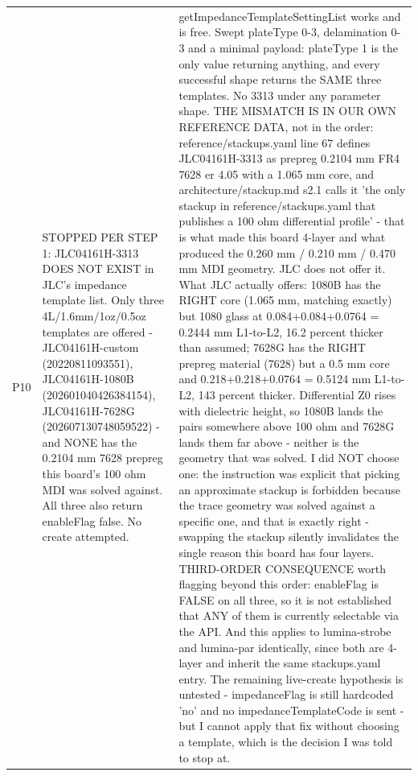 \documentclass[11pt,a4paper]{article}
\begin{document}
{\begin{longtable}{lp{5.2cm}p{7.2cm}}
P10 & STOPPED PER STEP 1: JLC04161H-3313 DOES NOT EXIST in JLC's impedance template list. Only three 4L/1.6mm/1oz/0.5oz templates are offered - JLC04161H-custom (20220811093551), JLC04161H-1080B (202601040426384154), JLC04161H-7628G (202607130748059522) - and NONE has the 0.2104 mm 7628 prepreg this board's 100 ohm MDI was solved against. All three also return enableFlag false. No create attempted. & getImpedanceTemplateSettingList works and is free. Swept plateType 0-3, delamination 0-3 and a minimal payload: plateType 1 is the only value returning anything, and every successful shape returns the SAME three templates. No 3313 under any parameter shape. THE MISMATCH IS IN OUR OWN REFERENCE DATA, not in the order: reference/stackups.yaml line 67 defines JLC04161H-3313 as prepreg 0.2104 mm FR4 7628 er 4.05 with a 1.065 mm core, and architecture/stackup.md s2.1 calls it 'the only stackup in reference/stackups.yaml that publishes a 100 ohm differential profile' - that is what made this board 4-layer and what produced the 0.260 mm / 0.210 mm / 0.470 mm MDI geometry. JLC does not offer it. What JLC actually offers: 1080B has the RIGHT core (1.065 mm, matching exactly) but 1080 glass at 0.084+0.084+0.0764 = 0.2444 mm L1-to-L2, 16.2 percent thicker than assumed; 7628G has the RIGHT prepreg material (7628) but a 0.5 mm core and 0.218+0.218+0.0764 = 0.5124 mm L1-to-L2, 143 percent thicker. Differential Z0 rises with dielectric height, so 1080B lands the pairs somewhere above 100 ohm and 7628G lands them far above - neither is the geometry that was solved. I did NOT choose one: the instruction was explicit that picking an approximate stackup is forbidden because the trace geometry was solved against a specific one, and that is exactly right - swapping the stackup silently invalidates the single reason this board has four layers. THIRD-ORDER CONSEQUENCE worth flagging beyond this order: enableFlag is FALSE on all three, so it is not established that ANY of them is currently selectable via the API. And this applies to lumina-strobe and lumina-par identically, since both are 4-layer and inherit the same stackups.yaml entry. The remaining live-create hypothesis is untested - impedanceFlag is still hardcoded 'no' and no impedanceTemplateCode is sent - but I cannot apply that fix without choosing a template, which is the decision I was told to stop at. \\

\end{longtable}}
\end{document}
